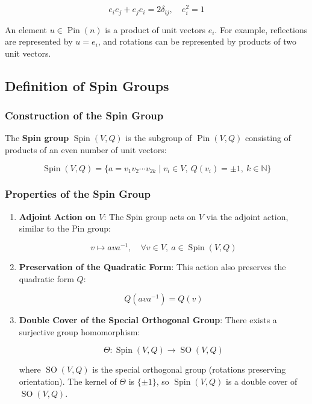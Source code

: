 \documentclass[a4paper,14pt]{article}
\theoremstyle{plain} %
\theoremstyle{definition} %
\theoremstyle{remark} %
\theoremstyle{definition}
\theoremstyle{remark}
\theoremstyle{remark}
\begin{document}
	\[
	e_i e_j + e_j e_i = 2 \delta_{ij}, \quad e_i^2 = 1
	\]
	
	An element \( u \in \operatorname{Pin}(n) \) is a product of unit vectors \( e_i \). For example, reflections are represented by \( u = e_i \), and rotations can be represented by products of two unit vectors.
	
	\subsection{Definition of Spin Groups}
	
	\subsubsection{Construction of the Spin Group}
	
	The \textbf{Spin group} \( \operatorname{Spin}(V, Q) \) is the subgroup of \( \operatorname{Pin}(V, Q) \) consisting of products of an even number of unit vectors:
	
	\[
	\operatorname{Spin}(V, Q) = \{ a = v_1 v_2 \cdots v_{2k} \mid v_i \in V, \ Q(v_i) = \pm 1, \ k \in \mathbb{N} \}
	\]
	
	\subsubsection{Properties of the Spin Group}
	
	\begin{enumerate}
		\item \textbf{Adjoint Action on \( V \)}: The Spin group acts on \( V \) via the adjoint action, similar to the Pin group:
		
		\begin{equation}
			v \mapsto a v a^{-1}, \quad \forall v \in V, \ a \in \operatorname{Spin}(V, Q)
		\end{equation}
		
		\item \textbf{Preservation of the Quadratic Form}: This action also preserves the quadratic form \( Q \):
		
		\[
		Q(a v a^{-1}) = Q(v)
		\]
		
		\item \textbf{Double Cover of the Special Orthogonal Group}: There exists a surjective group homomorphism:
		
		\[
		\Theta: \operatorname{Spin}(V, Q) \rightarrow \operatorname{SO}(V, Q)
		\]
		
		where \( \operatorname{SO}(V, Q) \) is the special orthogonal group (rotations preserving orientation). The kernel of \( \Theta \) is \( \{ \pm 1 \} \), so \( \operatorname{Spin}(V, Q) \) is a double cover of \( \operatorname{SO}(V, Q) \).
		
	\end{enumerate}
	
\end{document}
